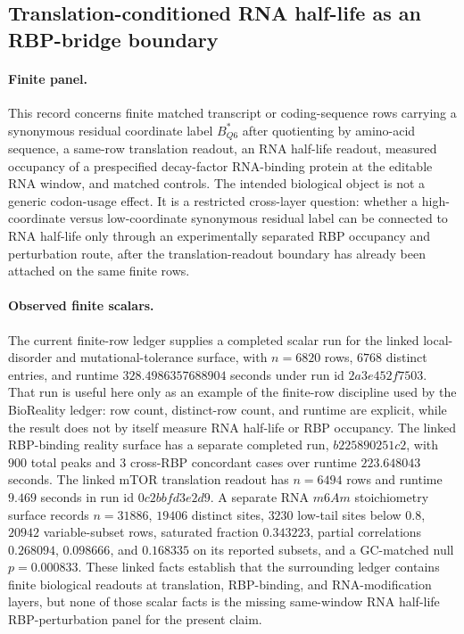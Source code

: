 \subsection{Translation-conditioned RNA half-life as an RBP-bridge boundary}\label{sec:bioreality-q6-translation-conditioned-rna-half-life-rbp-bridge}

\paragraph{Finite panel.}
This record concerns finite matched transcript or coding-sequence rows carrying a synonymous residual coordinate label $B^{\ast}_{Q6}$ after quotienting by amino-acid sequence, a same-row translation readout, an RNA half-life readout, measured occupancy of a prespecified decay-factor RNA-binding protein at the editable RNA window, and matched controls.  The intended biological object is not a generic codon-usage effect.  It is a restricted cross-layer question: whether a high-coordinate versus low-coordinate synonymous residual label can be connected to RNA half-life only through an experimentally separated RBP occupancy and perturbation route, after the translation-readout boundary has already been attached on the same finite rows.

\paragraph{Observed finite scalars.}
The current finite-row ledger supplies a completed scalar run for the linked local-disorder and mutational-tolerance surface, with $n=6820$ rows, $6768$ distinct entries, and runtime $328.4986357688904$ seconds under run id $2a3e452f7503$.  That run is useful here only as an example of the finite-row discipline used by the BioReality ledger: row count, distinct-row count, and runtime are explicit, while the result does not by itself measure RNA half-life or RBP occupancy.  The linked RBP-binding reality surface has a separate completed run, $b225890251c2$, with $900$ total peaks and $3$ cross-RBP concordant cases over runtime $223.648043$ seconds.  The linked mTOR translation readout has $n=6494$ rows and runtime $9.469$ seconds in run id $0c2bbfd3e2d9$.  A separate RNA $m6Am$ stoichiometry surface records $n=31886$, $19406$ distinct sites, $3230$ low-tail sites below $0.8$, $20942$ variable-subset rows, saturated fraction $0.343223$, partial correlations $0.268094$, $0.098666$, and $0.168335$ on its reported subsets, and a GC-matched null $p=0.000833$.  These linked facts establish that the surrounding ledger contains finite biological readouts at translation, RBP-binding, and RNA-modification layers, but none of those scalar facts is the missing same-window RNA half-life RBP-perturbation panel for the present claim.


